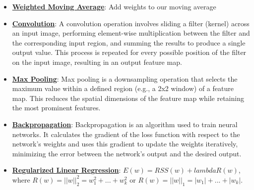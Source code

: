 \documentclass{article}%
\begin{document}
\begin{itemize}[leftmargin=*]
\item \href{https://purdue.brightspace.com/d2l/common/assets/pdfjs-d2l-dist/1.0.14-legacy/web/viewer.html?file=\%2Fcontent\%2Fenforced\%2F1095467-wl.202510.CS.24300.001\%2F07L2-Vision.pdf\%3Fou\%3D1095467\&lang=en-us\&container=d2l-fileviewer-rendered-pdf\&fullscreen=d2l-fileviewer-rendered-pdf-dialog\&height=667#page=40}{\textbf{Weighted Moving Average}}: Add weights to our moving average%
\item \href{https://purdue.brightspace.com/d2l/common/assets/pdfjs-d2l-dist/1.0.14-legacy/web/viewer.html?file=\%2Fcontent\%2Fenforced\%2F1095467-wl.202510.CS.24300.001\%2F09L1-cnn.pdf\%3Fou\%3D1095467\&lang=en-us\&container=d2l-fileviewer-rendered-pdf\&fullscreen=d2l-fileviewer-rendered-pdf-dialog\&height=667#page=6}{\textbf{Convolution}}: A convolution operation involves sliding a filter (kernel) across an input image, performing element-wise multiplication between the filter and the corresponding input region, and summing the results to produce a single output value. This process is repeated for every possible position of the filter on the input image, resulting in an output feature map.%
\item \href{https://purdue.brightspace.com/d2l/common/assets/pdfjs-d2l-dist/1.0.14-legacy/web/viewer.html?file=\%2Fcontent\%2Fenforced\%2F1095467-wl.202510.CS.24300.001\%2F09L1-cnn.pdf\%3Fou\%3D1095467\&lang=en-us\&container=d2l-fileviewer-rendered-pdf\&fullscreen=d2l-fileviewer-rendered-pdf-dialog\&height=667#page=14}{\textbf{Max Pooling}}: Max pooling is a downsampling operation that selects the maximum value within a defined region (e.g., a 2x2 window) of a feature map. This reduces the spatial dimensions of the feature map while retaining the most prominent features.%
\item \href{https://purdue.brightspace.com/d2l/common/assets/pdfjs-d2l-dist/1.0.14-legacy/web/viewer.html?file=\%2Fcontent\%2Fenforced\%2F1095467-wl.202510.CS.24300.001\%2F09L1-cnn.pdf\%3Fou\%3D1095467\&lang=en-us\&container=d2l-fileviewer-rendered-pdf\&fullscreen=d2l-fileviewer-rendered-pdf-dialog\&height=667#page=16}{\textbf{Backpropagation}}: Backpropagation is an algorithm used to train neural networks. It calculates the gradient of the loss function with respect to the network's weights and uses this gradient to update the weights iteratively, minimizing the error between the network's output and the desired output.%
\item \href{https://purdue.brightspace.com/d2l/common/assets/pdfjs-d2l-dist/1.0.14-legacy/web/viewer.html?file=\%2Fcontent\%2Fenforced\%2F1095467-wl.202510.CS.24300.001\%2F10L1-CrossValidation.pdf\%3Fou\%3D1095467\&lang=en-us\&container=d2l-fileviewer-rendered-pdf\&fullscreen=d2l-fileviewer-rendered-pdf-dialog\&height=667#page=17}{\textbf{Regularized Linear Regression}}: $E(w) = RSS(w) +  lambda R(w)$, where $R(w) = ||w||_2^2 = w_1^2 + ... + w_k^2$ or $R(w) = ||w||_1 = |w_1| + ... + |w_k|$.%

\end{itemize}
\end{document}
